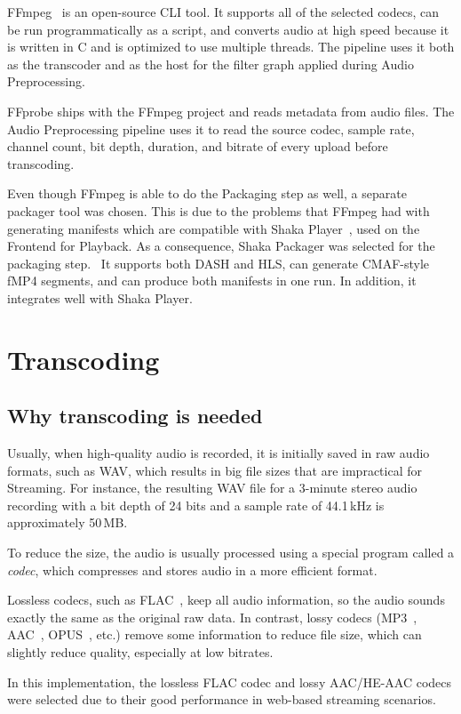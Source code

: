 \documentclass[a4paper,11pt]{article}
\begin{document}
FFmpeg~\parencite{ffmpeg} is an open-source CLI tool. It supports all
of the selected codecs, can be run programmatically as a script, and
converts audio at high speed because it is written in C and is
optimized to use multiple threads. The pipeline uses it both as the
transcoder and as the host for the filter graph applied during Audio
Preprocessing.

FFprobe ships with the FFmpeg project and reads metadata from audio
files. The Audio Preprocessing pipeline uses it to read the source
codec, sample rate, channel count, bit depth, duration, and bitrate of
every upload before transcoding.

Even though FFmpeg is able to do the Packaging step as well, a separate
packager tool was chosen. This is due to the problems that FFmpeg had
with generating manifests which are compatible with Shaka
Player~\parencite{shaka_player}, used on the Frontend for Playback. As
a consequence, Shaka Packager was selected for the packaging
step.~\parencite{shaka_packager} It supports both DASH and HLS, can
generate CMAF-style fMP4 segments, and can produce both manifests in
one run. In addition, it integrates well with Shaka Player.

\section{Transcoding}
\subsection{Why transcoding is needed}
Usually, when high-quality audio is recorded, it is initially saved in
raw audio formats, such as WAV, which results in big file sizes that
are impractical for Streaming. For instance, the resulting WAV file for
a 3-minute stereo audio recording with a bit depth of 24 bits and a
sample rate of 44.1\,kHz is approximately 50\,MB\@.

To reduce the size, the audio is usually processed using a special
program called a \textit{codec}, which compresses and stores audio in a
more efficient format.

Lossless codecs, such as FLAC~\parencite{flac_xiph}, keep all audio
information, so the audio sounds exactly the same as the original raw
data. In contrast, lossy codecs (MP3~\parencite{mp3},
AAC~\parencite{aac}, OPUS~\parencite{opus}, etc.) remove some
information to reduce file size, which can slightly reduce quality,
especially at low bitrates.

In this implementation, the lossless FLAC codec and lossy AAC/HE-AAC
codecs were selected due to their good performance in web-based
streaming scenarios.~\parencite{codec_evaluation_1,
codec_evaluation_2, codec_evaluation_3}
\end{document}
